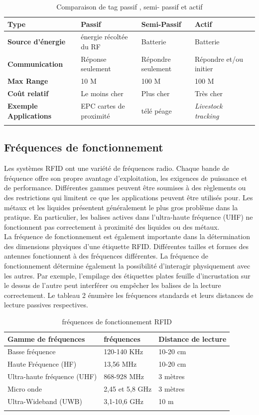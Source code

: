\documentclass[11pt, a4paper, twoside]{book}
\begin{document}
\begin{longtable}{|p{}|p{}|p{}| p{}| p{}|}
\hline
\textbf{Type} & \textbf{Passif} & \textbf{Semi-Passif} & \textbf{Actif} \\
\hline
\textbf{Source d'énergie} & énergie récoltée du RF & Batterie & Batterie \\
\hline
\textbf{Communication} & Réponse seulement & Répondre seulement & Répondre et/ou initier \\
\hline
\textbf{Max Range} & 10 M & 100 M &  100 M \\
\hline
\textbf{Coût relatif} & Le moins cher & Plus cher & Très cher \\
\hline
\textbf{Exemple Applications} & EPC cartes de proximité & télé péage &  \emph {Livestock tracking} \\
\hline
\caption{Comparaison de tag passif , semi- passif et actif}
\end{longtable}


\subsection{Fréquences de fonctionnement}
Les systèmes RFID ont une variété de fréquences radio. Chaque bande de fréquence offre son propre avantage d'exploitation, les exigences de puissance et de performance. Différentes gammes peuvent être soumises à des règlements ou des restrictions qui limitent ce que les applications peuvent être utilisés pour.
Les métaux et les liquides présentent généralement le plus gros problème dans la pratique. En particulier, les balises actives dans l'ultra-haute fréquence (UHF) ne fonctionnent pas correctement à proximité des liquides ou des métaux.\\


La fréquence de fonctionnement est également importante dans la détermination des dimensions physiques d'une étiquette RFID. Différentes tailles et formes des antennes fonctionnent à des fréquences différentes. La fréquence de fonctionnement détermine également la possibilité d'interagir physiquement avec les autres. Par exemple, l'empilage des étiquettes plates feuille d'incrustation sur le dessus de l'autre peut interférer ou empêcher les balises de la lecture correctement. Le tableau 2 énumère les fréquences standards et leurs distances de lecture passives respectives.\\
\begin{longtable}{|p{}|p{}|p{}|}
\hline
\textbf{Gamme de fréquences} & \textbf{fréquences} & \textbf{Distance de lecture} \\
\hline
Basse fréquence & 120-140 KHz & 10-20 cm  \\
\hline
Haute Fréquence (HF) & 13,56 MHz & 10-20 cm \\
\hline
Ultra-haute fréquence (UHF) & 868-928 MHz & 3 mètres \\
\hline
Micro onde & 2,45 et 5,8 GHz & 3 mètres \\
\hline
Ultra-Wideband (UWB) & 3,1-10,6 GHz & 10 m \\
\hline
\caption{fréquences de fonctionnement RFID}
\end{longtable}
\end{document}
